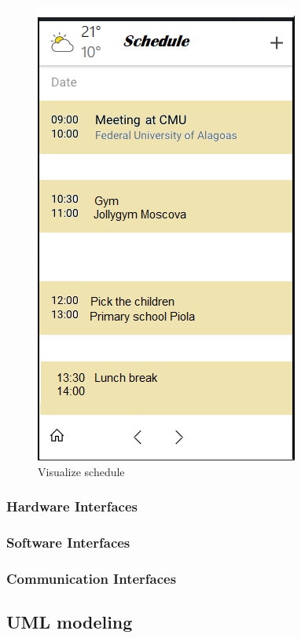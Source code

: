 		\begin{figure}[H]
			\centerline{\includegraphics[scale=0.5]{Images/schedule}}
			\caption{Visualize schedule}
		\end{figure}
	
	\subsubsection{Hardware Interfaces}
	\subsubsection{Software Interfaces}
	\subsubsection{Communication Interfaces}
\subsection{UML modeling}
